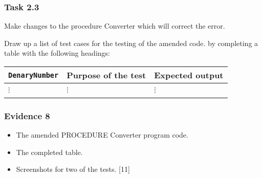 \subsubsection*{Task 2.3}

Make changes to the procedure Converter which will correct the error. 

Draw up a list of test cases for the testing of the amended code.
by completing a table with the following headings: 
\begin{center}
\begin{tabular}{|l|l|l|}
\hline 
\texttt{DenaryNumber} & Purpose of the test & Expected output\tabularnewline
\hline 
 &  & \tabularnewline
\hline 
$\vdots$ & $\vdots$ & $\vdots$\tabularnewline
\hline 
 &  & \tabularnewline
\hline 
\end{tabular}
\par\end{center}

\subsubsection*{Evidence 8}
\begin{itemize}
\item The amended PROCEDURE Converter program code.
\item The completed table. 
\item Screenshots for two of the tests. \hfill{}{[}11{]}
\end{itemize}